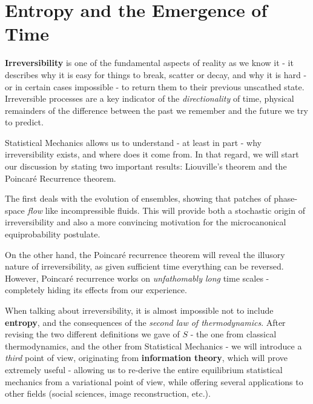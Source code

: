 \documentclass[../../main.tex]{subfiles}
\begin{document}
\chapter{Entropy and the Emergence of Time}

\textbf{Irreversibility} is one of the fundamental aspects of reality as we know it - it describes why it is easy for things to break, scatter or decay, and why it is hard - or in certain cases impossible - to return them to their previous unscathed state. Irreversible processes are a key indicator of the \textit{directionality} of time, physical remainders of the difference between the past we remember and the future we try to predict.

\medskip

Statistical Mechanics allows us to understand - at least in part - why irreversibility exists, and where does it come from. In that regard, we will start our discussion by stating two important results: Liouville's theorem and the Poincaré Recurrence theorem. 

\medskip

The first deals with the evolution of ensembles, showing that patches of phase-space \textit{flow} like incompressible fluids. This will provide both a stochastic origin of irreversibility and also a more convincing motivation for the microcanonical equiprobability postulate.

\medskip

On the other hand, the Poincaré recurrence theorem will reveal the illusory nature of irreversibility, as given sufficient time everything can be reversed. However, Poincaré recurrence works on \textit{unfathomably long} time scales - completely hiding its effects from our experience. 

\medskip
 
When talking about irreversibility, it is almost impossible not to include \textbf{entropy}, and the consequences of the \textit{second law of thermodynamics}. After revising the two different definitions we gave of $S$ - the one from classical thermodynamics, and the other from Statistical Mechanics - we will introduce a \textit{third} point of view, originating from \textbf{information theory}, which will prove extremely useful - allowing us to re-derive the entire equilibrium statistical mechanics from a variational point of view, while offering several applications to other fields (social sciences, image reconstruction, etc.). 
\end{document}
